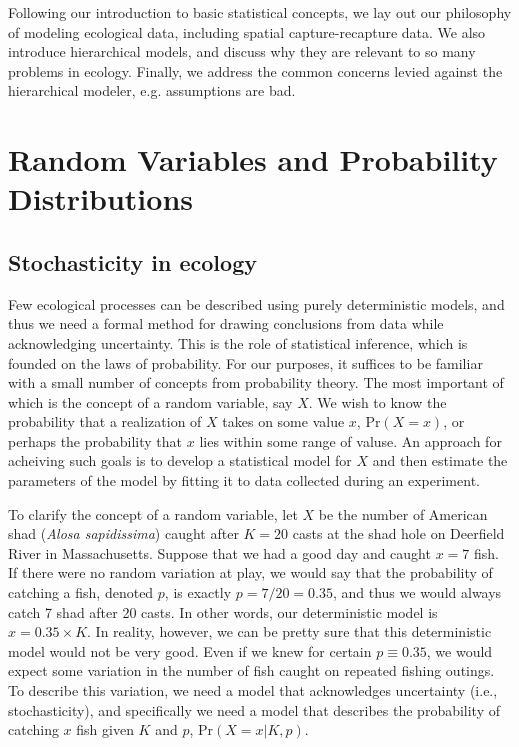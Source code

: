 Following our introduction to basic statistical concepts, we lay out our
philosophy of modeling ecological data, including spatial
capture-recapture data. We also introduce hierarchical
models, and discuss why they are relevant to so many problems in
ecology. Finally, we address the common concerns levied against the
hierarchical modeler, {e.g.} assumptions are bad.

\section{Random Variables and Probability Distributions}

\subsection{Stochasticity in ecology}


Few ecological processes can be described using purely deterministic
models, and thus we need a formal method for drawing conclusions from data while
acknowledging uncertainty. This is the role of statistical inference,
which is founded on the laws of probability. For our purposes, it
suffices to be familiar with a small number of concepts from
probability theory. The most important of which is the concept of a random
variable, say $X$. We wish to know the probability that a realization
of $X$ takes on some value $x$, %
$\text{Pr}(X=x)$, or perhaps the probability that $x$ lies within some
range of valuse. An approach for acheiving such goals is to develop a
statistical model for $X$ and then estimate the parameters of the
model by fitting it to data collected during an experiment.

To clarify the concept of a random variable, let $X$ be the number of
American shad (\emph{Alosa sapidissima}) caught after $K=20$ casts at
the shad hole on Deerfield River in Massachusetts. Suppose that
we had a good day and caught $x=7$ fish. If there were no random
variation at play, we would say that the probability of catching a
fish, denoted $p$, is exactly $p=7/20=0.35$, and thus we would always catch 7 shad after 20
casts. In other words, our deterministic model is $x =
0.35\times K$. In reality, however, we can be pretty sure that this
deterministic model would not be very good. Even if we knew for
certain $p \equiv 0.35$, we would expect some variation in the number
of fish caught on repeated fishing outings. To describe this
variation, we need a model that acknowledges uncertainty (i.e.,
stochasticity), and specifically we need a model that describes the
probability of catching $x$ fish given $K$ and $p$,
$\text{Pr}(X=x|K,p)$.

